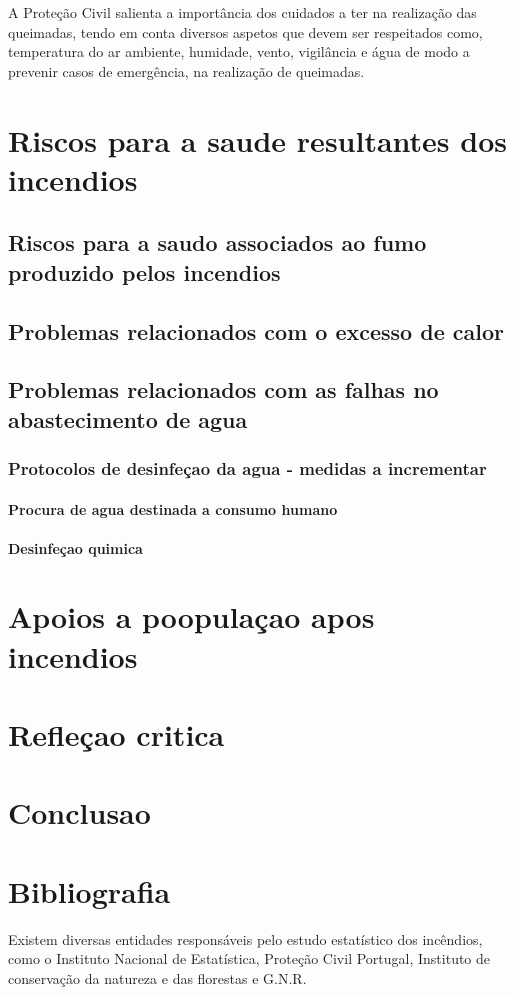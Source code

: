 \documentclass[a4paper,11pt,onecloumn,oneside]{article}
\begin{document}
A Proteção Civil salienta a importância dos cuidados a ter na realização das queimadas, tendo em conta diversos aspetos que devem ser respeitados como, temperatura do ar ambiente, humidade, vento, vigilância e água de modo a prevenir casos de emergência, na realização de queimadas.

\part{Riscos para a saude resultantes dos incendios}

\chapter{Riscos para a saudo associados ao fumo produzido pelos incendios}
\chapter{Problemas relacionados com o excesso de calor}
\chapter{Problemas relacionados com as falhas no abastecimento de agua}

\section{Protocolos de desinfeçao da agua - medidas a incrementar}

\subsection{Procura de agua destinada a consumo humano}
\subsection{Desinfeçao quimica}

\part{Apoios a poopulaçao apos incendios}

\part{Refleçao critica}

\part{Conclusao}

\part{Bibliografia}

Existem diversas entidades responsáveis pelo estudo estatístico dos incêndios, como o Instituto Nacional de Estatística, Proteção Civil Portugal, Instituto de conservação da natureza e das florestas e G.N.R.
\end{document}
